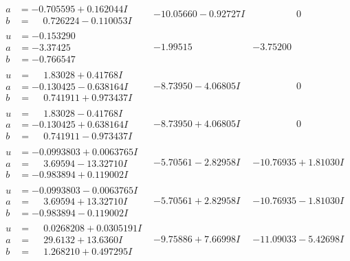 \documentclass[1p]{elsarticle_modified}
\theoremstyle{definition}
\begin{document}
$$\begin{array}{c|c|c}
\begin{aligned}
a &= -0.705595 + 0.162044 I \\
b &= \phantom{-}0.726224 - 0.110053 I\end{aligned}
 & -10.05660 - 0.92727 I & \phantom{-0.000000 } 0 \\ \hline\begin{aligned}
u &= -0.153290\phantom{ +0.000000I} \\
a &= -3.37425\phantom{ +0.000000I} \\
b &= -0.766547\phantom{ +0.000000I}\end{aligned}
 & -1.99515\phantom{ +0.000000I} & -3.75200\phantom{ +0.000000I} \\ \hline\begin{aligned}
u &= \phantom{-}1.83028 + 0.41768 I \\
a &= -0.130425 - 0.638164 I \\
b &= \phantom{-}0.741911 + 0.973437 I\end{aligned}
 & -8.73950 - 4.06805 I & \phantom{-0.000000 } 0 \\ \hline\begin{aligned}
u &= \phantom{-}1.83028 - 0.41768 I \\
a &= -0.130425 + 0.638164 I \\
b &= \phantom{-}0.741911 - 0.973437 I\end{aligned}
 & -8.73950 + 4.06805 I & \phantom{-0.000000 } 0 \\ \hline\begin{aligned}
u &= -0.0993803 + 0.0063765 I \\
a &= \phantom{-}3.69594 - 13.32710 I \\
b &= -0.983894 + 0.119002 I\end{aligned}
 & -5.70561 - 2.82958 I & -10.76935 + 1.81030 I \\ \hline\begin{aligned}
u &= -0.0993803 - 0.0063765 I \\
a &= \phantom{-}3.69594 + 13.32710 I \\
b &= -0.983894 - 0.119002 I\end{aligned}
 & -5.70561 + 2.82958 I & -10.76935 - 1.81030 I \\ \hline\begin{aligned}
u &= \phantom{-}0.0268208 + 0.0305191 I \\
a &= \phantom{-}29.6132 + 13.6360 I \\
b &= \phantom{-}1.268210 + 0.497295 I\end{aligned}
 & -9.75886 + 7.66998 I & -11.09033 - 5.42698 I \\ \hline\begin{aligned}

\end{aligned}
\end{array}$$
\end{document}
